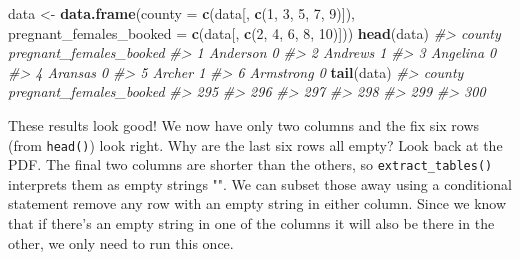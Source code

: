 \documentclass[
  12pt,
]{book}
\newenvironment{Shaded}{\begin{snugshade}}{\end{snugshade}}
\newcommand{\CommentTok}[1]{\textcolor[rgb]{0.56,0.35,0.01}{\textit{#1}}}
\newcommand{\DataTypeTok}[1]{\textcolor[rgb]{0.13,0.29,0.53}{#1}}
\newcommand{\DecValTok}[1]{\textcolor[rgb]{0.00,0.00,0.81}{#1}}
\newcommand{\KeywordTok}[1]{\textcolor[rgb]{0.13,0.29,0.53}{\textbf{#1}}}
\newcommand{\NormalTok}[1]{#1}
\newcommand{\StringTok}[1]{\textcolor[rgb]{0.31,0.60,0.02}{#1}}
\begin{document}
\begin{Shaded}
\begin{Highlighting}[]
\NormalTok{data <{-}}\StringTok{ }\KeywordTok{data.frame}\NormalTok{(}\DataTypeTok{county =} \KeywordTok{c}\NormalTok{(data[, }\KeywordTok{c}\NormalTok{(}\DecValTok{1}\NormalTok{, }\DecValTok{3}\NormalTok{, }\DecValTok{5}\NormalTok{, }\DecValTok{7}\NormalTok{, }\DecValTok{9}\NormalTok{)]),}
              \DataTypeTok{pregnant\_females\_booked =} \KeywordTok{c}\NormalTok{(data[, }\KeywordTok{c}\NormalTok{(}\DecValTok{2}\NormalTok{, }\DecValTok{4}\NormalTok{, }\DecValTok{6}\NormalTok{, }\DecValTok{8}\NormalTok{, }\DecValTok{10}\NormalTok{)]))}
\KeywordTok{head}\NormalTok{(data)}
\CommentTok{\#>      county pregnant\_females\_booked}
\CommentTok{\#> 1  Anderson                       0}
\CommentTok{\#> 2   Andrews                       1}
\CommentTok{\#> 3  Angelina                       0}
\CommentTok{\#> 4   Aransas                       0}
\CommentTok{\#> 5    Archer                       1}
\CommentTok{\#> 6 Armstrong                       0}
\KeywordTok{tail}\NormalTok{(data)}
\CommentTok{\#>     county pregnant\_females\_booked}
\CommentTok{\#> 295                               }
\CommentTok{\#> 296                               }
\CommentTok{\#> 297                               }
\CommentTok{\#> 298                               }
\CommentTok{\#> 299                               }
\CommentTok{\#> 300}
\end{Highlighting}
\end{Shaded}

These results look good! We now have only two columns and the fix six rows (from \texttt{head()}) look right. Why are the last six rows all empty? Look back at the PDF. The final two columns are shorter than the others, so \texttt{extract\_tables()} interprets them as empty strings "". We can subset those away using a conditional statement remove any row with an empty string in either column. Since we know that if there's an empty string in one of the columns it will also be there in the other, we only need to run this once.
\end{document}
